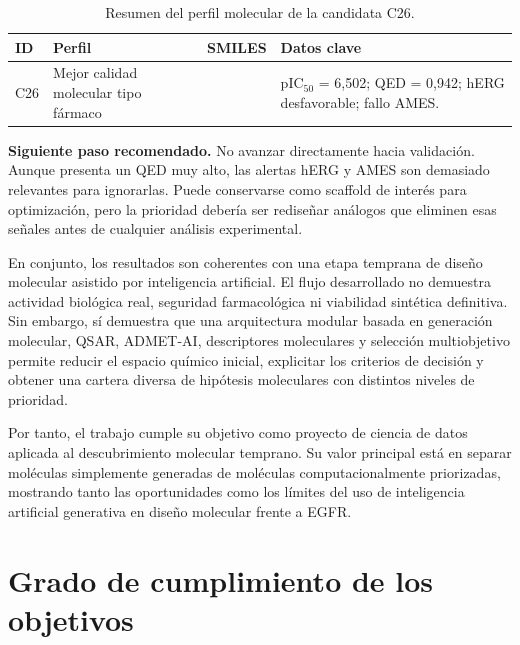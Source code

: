 \documentclass[IB]{TFUOC}%
\begin{document}
\vspace{0.35cm}

\begin{samepage}
\begin{table}[H]
    \centering
    \small
    \renewcommand{\arraystretch}{1.25}
    \begin{tabularx}{\textwidth}{p{1cm} p{3cm} Y p{4cm}}
        \hline
        \textbf{ID} & \textbf{Perfil} & \textbf{SMILES} & \textbf{Datos clave} \\
        \hline
        C26 &
        Mejor calidad molecular tipo fármaco &
        \texttt{} &
        pIC$_{50}$ = 6,502; QED = 0,942; hERG desfavorable; fallo AMES. \\
        \hline
    \end{tabularx}
    \caption{Resumen del perfil molecular de la candidata C26.}
    \label{tab:perfil_c26}
\end{table}

\noindent\textbf{Siguiente paso recomendado.}
No avanzar directamente hacia validación. Aunque presenta un QED muy alto, las alertas hERG y AMES son demasiado relevantes para ignorarlas. Puede conservarse como scaffold de interés para optimización, pero la prioridad debería ser rediseñar análogos que eliminen esas señales antes de cualquier análisis experimental.
\end{samepage}

En conjunto, los resultados son coherentes con una etapa temprana de diseño molecular asistido por inteligencia artificial. El flujo desarrollado no demuestra actividad biológica real, seguridad farmacológica ni viabilidad sintética definitiva. Sin embargo, sí demuestra que una arquitectura modular basada en generación molecular, QSAR, ADMET-AI, descriptores moleculares y selección multiobjetivo permite reducir el espacio químico inicial, explicitar los criterios de decisión y obtener una cartera diversa de hipótesis moleculares con distintos niveles de prioridad.

Por tanto, el trabajo cumple su objetivo como proyecto de ciencia de datos aplicada al descubrimiento molecular temprano. Su valor principal está en separar moléculas simplemente generadas de moléculas computacionalmente priorizadas, mostrando tanto las oportunidades como los límites del uso de inteligencia artificial generativa en diseño molecular frente a EGFR.


\section{Grado de cumplimiento de los objetivos}
\end{document}
